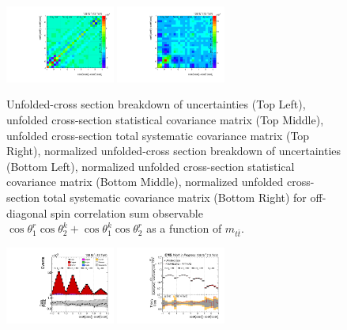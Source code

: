 \begin{refsection}
\begin{figure}[htb]
\begin{center}
 \includegraphics[width=0.32\textwidth]{fig_fullRun2UL/unfolding/combined/StatCovMatrixNorm_rebinnedB_c_Prk_mttbar.pdf}
 \includegraphics[width=0.32\textwidth]{fig_fullRun2UL/unfolding/combined/TotalSystCovMatrixNorm_rebinnedB_c_Prk_mttbar.pdf} \\
\caption{Unfolded-cross section breakdown of uncertainties (Top Left), unfolded cross-section statistical covariance matrix (Top Middle), unfolded cross-section total systematic covariance matrix (Top Right), normalized unfolded-cross section breakdown of uncertainties (Bottom Left), normalized unfolded cross-section statistical covariance matrix (Bottom Middle), normalized unfolded cross-section total systematic covariance matrix (Bottom Right) for off-diagonal spin correlation sum observable $\cos\theta_{1}^{r}\cos\theta_{2}^{k}+\cos\theta_{1}^{k}\cos\theta_{2}^{r}$ as a function of $m_{t\bar{t}}$.}
\label{fig:c_Prk_mttbar_uncertainties}
\end{center}
\end{figure}
\clearpage
\begin{figure}[htb]
\begin{center}
 \includegraphics[width=0.32\textwidth]{fig_fullRun2UL/controlplots/combined/Hyp_LLBarCMrk_vs_TTBarMass.pdf}
 \includegraphics[width=0.32\textwidth]{fig_fullRun2UL/unfolding/combined/UnfoldedResults_c_Mrk_mttbar.pdf}

\end{center}
\end{figure}
\end{refsection}
